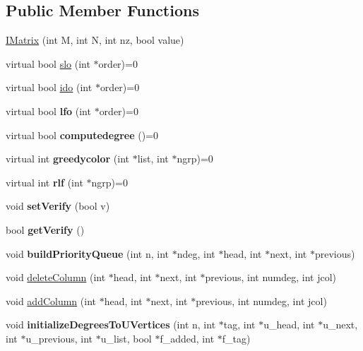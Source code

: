 \subsection*{Public Member Functions}
\begin{DoxyCompactItemize}
\item 
\hyperlink{classIMatrix_afe2001929e7328d988dc1d85c0d18c27}{IMatrix} (int M, int N, int nz, bool value)
\item 
virtual bool \hyperlink{classIMatrix_ad6d689b7a38120b6463f1965915f7163}{slo} (int $\ast$order)=0
\item 
virtual bool \hyperlink{classIMatrix_a8e0f3a1062786b6a20548e847de1109b}{ido} (int $\ast$order)=0
\item 
\hypertarget{classIMatrix_a3e7d104e9d2f662b59e59d84b60b1260}{
virtual bool {\bfseries lfo} (int $\ast$order)=0}
\label{classIMatrix_a3e7d104e9d2f662b59e59d84b60b1260}

\item 
\hypertarget{classIMatrix_adba40eab9af7ad22f2519493dc2cc50d}{
virtual bool {\bfseries computedegree} ()=0}
\label{classIMatrix_adba40eab9af7ad22f2519493dc2cc50d}

\item 
\hypertarget{classIMatrix_afa61e6e0a0baf59bd5c898ef759fc5f0}{
virtual int {\bfseries greedycolor} (int $\ast$list, int $\ast$ngrp)=0}
\label{classIMatrix_afa61e6e0a0baf59bd5c898ef759fc5f0}

\item 
\hypertarget{classIMatrix_a48855671733fe3f89e96f3c9a606d04f}{
virtual int {\bfseries rlf} (int $\ast$ngrp)=0}
\label{classIMatrix_a48855671733fe3f89e96f3c9a606d04f}

\item 
\hypertarget{classIMatrix_aa62c5ede68855fb7a3cf5332767b9699}{
void {\bfseries setVerify} (bool v)}
\label{classIMatrix_aa62c5ede68855fb7a3cf5332767b9699}

\item 
\hypertarget{classIMatrix_af112ae04ef11c8e780b9e11196442eb0}{
bool {\bfseries getVerify} ()}
\label{classIMatrix_af112ae04ef11c8e780b9e11196442eb0}

\item 
\hypertarget{classIMatrix_ac866b3b6ae6ed3802207617cbe083636}{
void {\bfseries buildPriorityQueue} (int n, int $\ast$ndeg, int $\ast$head, int $\ast$next, int $\ast$previous)}
\label{classIMatrix_ac866b3b6ae6ed3802207617cbe083636}

\item 
void \hyperlink{classIMatrix_adef00da9cba0f17ec0d64d688a3ebc58}{deleteColumn} (int $\ast$head, int $\ast$next, int $\ast$previous, int numdeg, int jcol)
\item 
void \hyperlink{classIMatrix_adfe1c1b95399cadb8d07a17d10ea6118}{addColumn} (int $\ast$head, int $\ast$next, int $\ast$previous, int numdeg, int jcol)
\item 
\hypertarget{classIMatrix_a43dbfcf605af6de605db7c5c95cecca4}{
void {\bfseries initializeDegreesToUVertices} (int n, int $\ast$tag, int $\ast$u\_\-head, int $\ast$u\_\-next, int $\ast$u\_\-previous, int $\ast$u\_\-list, bool $\ast$f\_\-added, int $\ast$f\_\-tag)}
\label{classIMatrix_a43dbfcf605af6de605db7c5c95cecca4}


\end{DoxyCompactItemize}
